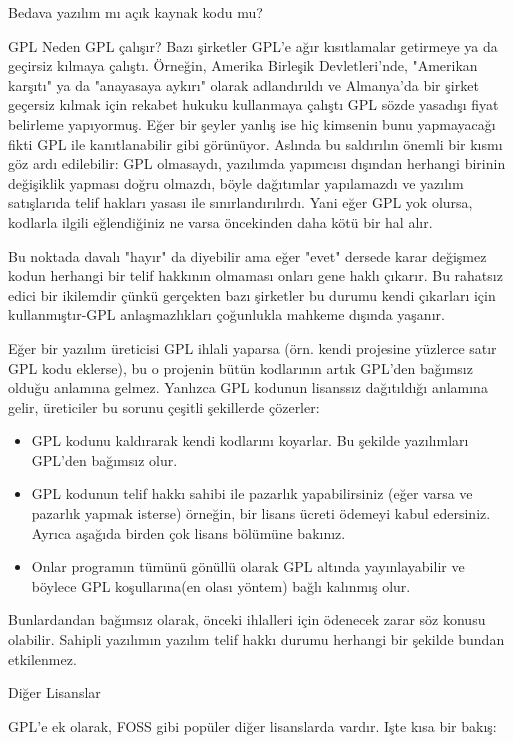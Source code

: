 \begin{section}{Bedava yazılım mı açık kaynak kodu mu?}
\begin{subsection}{GPL}
Neden GPL çalışır? Bazı şirketler GPL'e ağır kısıtlamalar getirmeye ya da geçirsiz kılmaya çalıştı. Örneğin, Amerika Birleşik Devletleri'nde, "Amerikan karşıtı" ya da "anayasaya aykırı" olarak adlandırıldı ve Almanya'da bir şirket geçersiz kılmak için rekabet hukuku kullanmaya çalıştı GPL sözde yasadışı fiyat belirleme yapıyormuş. Eğer bir şeyler yanlış ise hiç kimsenin bunu yapmayacağı fikti GPL ile kanıtlanabilir gibi görünüyor. Aslında bu saldırılın önemli bir kısmı göz ardı edilebilir: GPL olmasaydı, yazılımda yapımcısı dışından herhangi birinin değişiklik yapması doğru olmazdı, böyle dağıtımlar yapılamazdı ve yazılım satışlarıda telif hakları yasası ile sınırlandırılırdı. Yani eğer GPL yok olursa, kodlarla ilgili eğlendiğiniz ne varsa öncekinden daha kötü bir hal alır.

Bu noktada davalı "hayır" da diyebilir ama eğer "evet" dersede karar değişmez kodun herhangi bir telif hakkının olmaması onları gene haklı çıkarır. Bu rahatsız edici bir ikilemdir çünkü gerçekten bazı şirketler bu durumu kendi çıkarları için kullanmıştır-GPL anlaşmazlıkları çoğunlukla mahkeme dışında yaşanır.

Eğer bir yazılım üreticisi GPL ihlali yaparsa (örn. kendi projesine yüzlerce satır GPL kodu eklerse), bu o projenin bütün kodlarının artık GPL'den bağımsız olduğu anlamına gelmez. Yanlızca GPL kodunun lisanssız dağıtıldığı anlamına gelir, üreticiler  bu sorunu çeşitli şekillerde çözerler:
\begin{itemize}
 \item GPL kodunu kaldırarak kendi kodlarını koyarlar. Bu şekilde yazılımları GPL'den bağımsız olur.
 \item GPL kodunun telif hakkı sahibi ile pazarlık yapabilirsiniz (eğer varsa ve pazarlık yapmak isterse) örneğin, bir lisans ücreti ödemeyi kabul edersiniz.
Ayrıca aşağıda birden çok lisans bölümüne bakınız.
 \item Onlar programın tümünü gönüllü olarak GPL altında  yayınlayabilir ve böylece GPL koşullarına(en olası yöntem) bağlı kalınmış olur.
 \end{itemize}

Bunlardandan bağımsız olarak, önceki ihlalleri için ödenecek zarar söz konusu olabilir. Sahipli yazılımın yazılım telif hakkı durumu  herhangi bir şekilde bundan etkilenmez.
\end{subsection}
\begin{subsection}{Diğer Lisanslar}

GPL'e ek olarak, FOSS gibi popüler diğer lisanslarda vardır. Işte kısa bir bakış:


\end{subsection}
\end{section}
